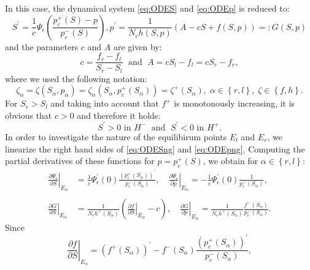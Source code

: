 \documentclass[smallextended]{svjour3}       %
\begin{document}
In this case, the dynamical system \eqref{eq:ODES} and \eqref{eq:ODEp} is reduced to:
\begin{subequations}
\begin{equation}
\label{eq:ODESng} 
S^\prime = \frac{1}{c} \Psi_\epsilon \left( \frac{p_c^+\left( S \right) -p}{p_c^-\left( S \right)} \right),
\end{equation}
\begin{equation}
\label{eq:ODEpng}
p^\prime = \frac{1}{N_c h\left(S,p \right)} \left( A- cS + f\left(S,p\right) \right) =: G\left(S,p \right)
\end{equation}
\end{subequations}
and the parameters $c$ and $A$ are given by:
$$
c = \frac{f_r-f_l}{S_r-S_l}\;\text{ and }\;A = c S_l -f_l = c S_r -f_r,
$$
where we used the following notation:
$$
\zeta_\alpha = \zeta \left(S_\alpha,p_\alpha \right) = \zeta_\alpha \left( S_\alpha,p_c^+\left( S_\alpha \right) \right) = \zeta^+\left( S_\alpha \right),\; \alpha \in \left\{r,l \right\},\;\zeta \in \left\{ f,h \right\}.
$$
For $S_r>S_l$ and taking into account that $f^+$ is monotonously increasing, it is obvious that $c>0$ and therefore it holds:
$$
S^\prime > 0 \text{ in } H^- \;\text{ and }\; S^\prime < 0 \text{ in } H^+.
$$
In order to investigate the nature of the equilibirum points $E_l$ and $E_r$, we linearize the right hand sides of \eqref{eq:ODESng}  and \eqref{eq:ODEpng}.
Computing the partial derivatives of these functions for $p=p_c^+\left( S \right)$, we obtain for $\alpha \in \left\{r,l \right\}$:
\begin{align*}
\left. \frac{\partial \Psi_\epsilon}{\partial S}\right|_{E_\alpha}  &=\frac{1}{c} \Psi^\prime_\epsilon \left(0 \right) \frac{ \left( p_c^+\left( S_\alpha \right) \right)^\prime }{ p_c^-\left( S_\alpha \right) },
\quad \left.\frac{\partial \Psi_\epsilon}{\partial p}\right|_{E_\alpha} = -\frac{1}{c} \Psi^\prime_\epsilon \left(0 \right) \frac{ 1 }{ p_c^-\left( S_\alpha \right) }, \\
\ \\
\left. \frac{\partial G}{\partial S} \right|_{E_\alpha} &= \frac{1}{N_ch^+\left( S_\alpha \right)}\left( \left. \frac{\partial f}{\partial S} \right|_{E_\alpha} -c \right),\quad 
\left. \frac{\partial G}{\partial p} \right|_{E_\alpha}= \frac{1}{N_ch^+\left( S_\alpha \right)} \frac{f^-\left( S_\alpha \right)}{p_c^-\left( S_\alpha \right)}.
\end{align*}
Since
$$
\left. \frac{\partial f}{\partial S}  \right|_{E_\alpha} = \left( f^+\left( S_\alpha \right) \right)^\prime - f^-\left( S_\alpha \right) \frac{\left( p_c^+\left( S_\alpha \right) \right)^\prime }{p_c^-\left( S_\alpha \right)},
$$
\end{document}
